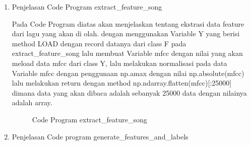 \begin{enumerate}
\subitem dengan menggunakan code ini akan menampilkan hasil dari penggunaan display mfcc



\subitem hasilnya adalah sebagai berikut, dengan menampilkan data dari file disco.00035.au dapat dilihat pada gambar \ref{data10} :

\begin{figure}[!htbp]
      \caption{Hasil dari Code Program display\_mfcc}
      \label{data10}
\end{figure}

\item Penjelasan Code Program extract\_feature\_song



\subitem Pada Code Program diatas akan menjelaskan tentang ekstrasi data feature dari lagu yang akan di olah. dengan menggunakan Variable Y yang berisi method LOAD dengan record datanya dari class F pada extract\_feature\_song lalu membuat Variable mfcc dengan nilai yang akan meload data mfcc dari class Y, lalu melakukan normalisasi pada data Variable mfcc dengan penggunaan np.amax dengan nilai np.absolute(mfcc) lalu melakukan return dengan method np.ndarray.flatten(mfcc)[:25000] dimana data yang akan dibaca adalah sebanyak 25000 data dengan nilainya adalah array.

\begin{figure}[!htbp]
      \caption{Code Program extract\_feature\_song}
      \label{data11}
\end{figure}


\item Penjelasan Code program  generate\_features\_and\_labels


\end{enumerate}
